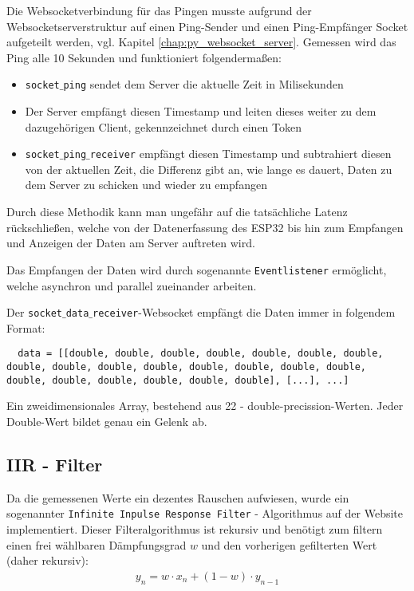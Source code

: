 \documentclass[paper=a4,12pt]{scrreprt}
\begin{document}
Die Websocketverbindung für das Pingen musste aufgrund der Websocketserverstruktur auf einen Ping-Sender und einen Ping-Empfänger Socket aufgeteilt werden, vgl. Kapitel \ref{chap:py_websocket_server}. Gemessen wird das Ping alle 10 Sekunden
und funktioniert folgendermaßen:\newline
\begin{itemize}
  \item \texttt{socket$\_$ping} sendet dem Server die aktuelle Zeit in Milisekunden
  \item Der Server empfängt diesen Timestamp und leiten dieses weiter zu dem dazugehörigen Client, gekennzeichnet durch einen Token
  \item \texttt{socket$\_$ping$\_$receiver} empfängt diesen Timestamp und subtrahiert diesen von der aktuellen Zeit, die Differenz gibt an, wie lange es dauert, Daten zu dem Server zu schicken und wieder zu empfangen
\end{itemize}

Durch diese Methodik kann man ungefähr auf die tatsächliche Latenz rückschließen, welche von der Datenerfassung des ESP32 bis hin zum Empfangen und Anzeigen der Daten am Server auftreten wird.\newline

Das Empfangen der Daten wird durch sogenannte \texttt{Eventlistener} ermöglicht, welche asynchron und parallel zueinander arbeiten.\newline

Der \texttt{socket$\_$data$\_$receiver}-Websocket empfängt die Daten immer in folgendem Format:\newline

\begin{lstlisting}
  data = [[double, double, double, double, double, double, double, double, double, double, double, double, double, double, double, double, double, double, double, double, double], [...], ...]
\end{lstlisting}

Ein zweidimensionales Array, bestehend aus 22 - double-precission-Werten. Jeder Double-Wert bildet genau ein Gelenk ab.\newline


\subsection{IIR - Filter}

Da die gemessenen Werte ein dezentes Rauschen aufwiesen, wurde ein sogenannter \texttt{Infinite Inpulse Response Filter}\cite{iir_filter} - Algorithmus auf der Website implementiert. Dieser Filteralgorithmus ist rekursiv und benötigt zum filtern einen frei wählbaren Dämpfungsgrad $w$ und den vorherigen gefilterten Wert (daher rekursiv):
\begin{align*}
  y_n = w \cdot x_n + (1 - w) \cdot y_{n-1}
\end{align*}
\end{document}
